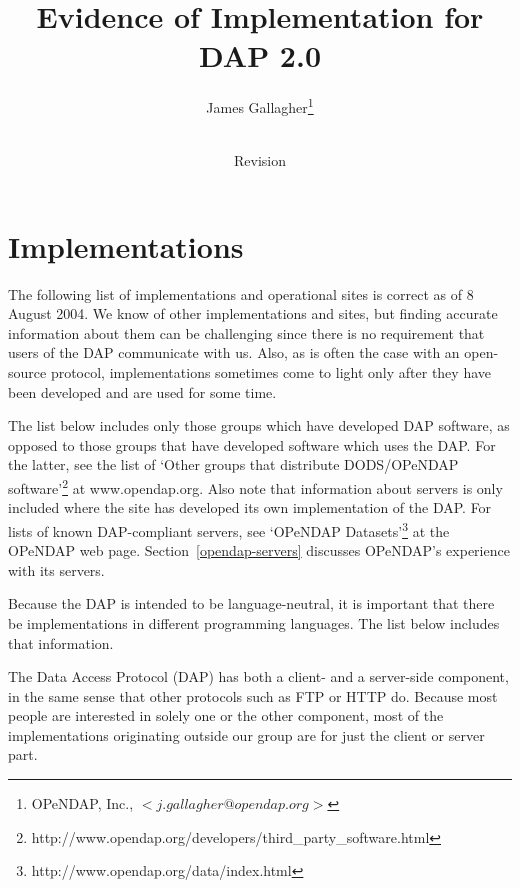 \documentclass[justify]{dods-paper}
\title{Evidence of Implementation for DAP 2.0}
\author{James Gallagher\thanks{OPeNDAP, Inc., $<j.gallagher@opendap.org>$}}
\date{\rcsInfoDate \\ Revision \rcsInfoRevision}
\begin{document}
\maketitle

\section{Implementations}

The following list of implementations and operational sites is correct as of
8 August 2004. We know of other implementations and sites, but finding
accurate information about them can be challenging since there is no
requirement that users of the DAP communicate with us. Also, as is often the
case with an open-source protocol, implementations sometimes come to light
only after they have been developed and are used for some time.

The list below includes only those groups which have developed DAP software,
as opposed to those groups that have developed software which uses the DAP.
For the latter, see the list of `Other groups that distribute DODS/OPeNDAP
software'\footnote{http://www.opendap.org/developers/third\_party\_software.html}
at www.opendap.org. Also note that information about servers is only included
where the site has developed its own implementation of the DAP. For lists of
known DAP-compliant servers, see `OPeNDAP
Datasets'\footnote{http://www.opendap.org/data/index.html} at the OPeNDAP web
page. Section~\ref{opendap-servers} discusses OPeNDAP's experience with its
servers. 

Because the DAP is intended to be language-neutral, it is important that
there be implementations in different programming languages. The list below
includes that information.

The Data Access Protocol (DAP) has both a client- and a server-side
component, in the same sense that other protocols such as FTP or HTTP do.
Because most people are interested in solely one or the other component, most
of the implementations originating outside our group are for just the client
or server part.
\end{document}
